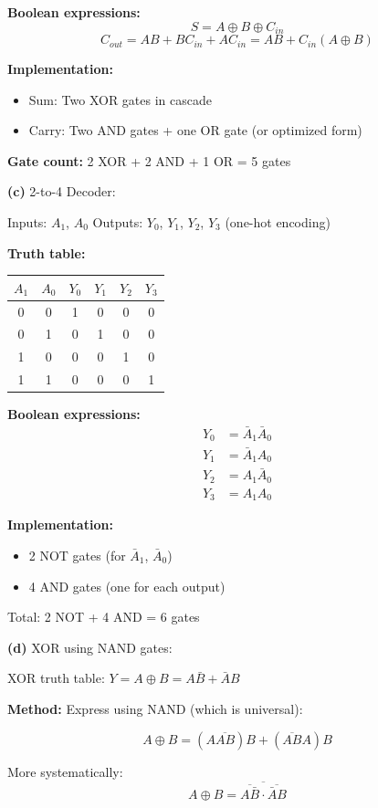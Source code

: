 \documentclass[12pt,a4paper]{article}
\begin{document}
\begin{solution}
\textbf{Boolean expressions:}
$$S = A \oplus B \oplus C_{in}$$
$$C_{out} = AB + BC_{in} + AC_{in} = AB + C_{in}(A \oplus B)$$

\textbf{Implementation:}
\begin{itemize}
    \item Sum: Two XOR gates in cascade
    \item Carry: Two AND gates + one OR gate (or optimized form)
\end{itemize}

\textbf{Gate count:} 2 XOR + 2 AND + 1 OR = 5 gates

\textbf{(c)} 2-to-4 Decoder:

Inputs: $A_1$, $A_0$
Outputs: $Y_0$, $Y_1$, $Y_2$, $Y_3$ (one-hot encoding)

\textbf{Truth table:}
\begin{tabular}{cc|cccc}
$A_1$ & $A_0$ & $Y_0$ & $Y_1$ & $Y_2$ & $Y_3$ \\
\hline
0 & 0 & 1 & 0 & 0 & 0 \\
0 & 1 & 0 & 1 & 0 & 0 \\
1 & 0 & 0 & 0 & 1 & 0 \\
1 & 1 & 0 & 0 & 0 & 1 \\
\end{tabular}

\textbf{Boolean expressions:}
\begin{align*}
Y_0 &= \bar{A}_1 \bar{A}_0 \\
Y_1 &= \bar{A}_1 A_0 \\
Y_2 &= A_1 \bar{A}_0 \\
Y_3 &= A_1 A_0
\end{align*}

\textbf{Implementation:}
\begin{itemize}
    \item 2 NOT gates (for $\bar{A}_1$, $\bar{A}_0$)
    \item 4 AND gates (one for each output)
\end{itemize}

Total: 2 NOT + 4 AND = 6 gates

\textbf{(d)} XOR using NAND gates:

XOR truth table: $Y = A \oplus B = A\bar{B} + \bar{A}B$

\textbf{Method:} Express using NAND (which is universal):

$$A \oplus B = (A\overline{AB})B + (\overline{AB}A)B$$

More systematically:
$$A \oplus B = \overline{\overline{A\bar{B}} \cdot \overline{\bar{A}B}}$$


\end{solution}
\end{document}

